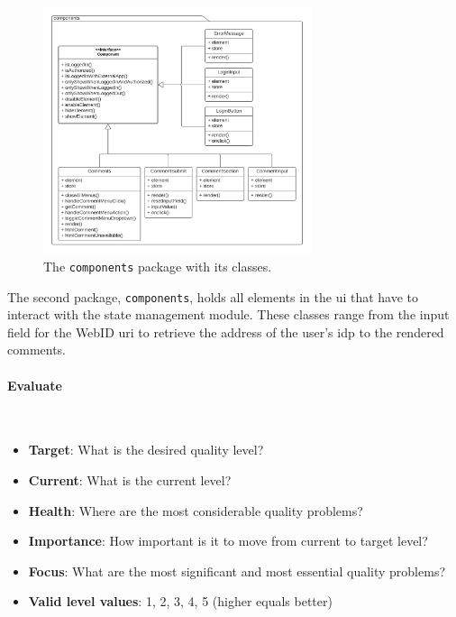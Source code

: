 \begin{figure}[H]
    \centering
    \includegraphics[width=0.7\textwidth]{prototype/graphs/poc-comment-package-components.png}
    \caption{The \texttt{components} package with its classes.}
    \label{fig:poc-comment-package-components}
\end{figure}

The second package, \texttt{components}, holds all elements in the \gls{ui} that have to interact with the state management module. These classes range from the input field for the WebID \gls{uri} to retrieve the address of the user's \gls{idp} to the rendered comments.
\vspace{0.5cm}
\paragraph{Evaluate}\mbox{}\\

\begin{itemize}
    \item \textbf{Target}: What is the desired quality level?
    \item \textbf{Current}: What is the current level?
    \item \textbf{Health}: Where are the most considerable quality problems?
    \item \textbf{Importance}: How important is it to move from current to target level?
    \item \textbf{Focus}: What are the most significant and most essential quality problems?
    \item \textbf{Valid level values}: 1, 2, 3, 4, 5 (higher equals better)
\end{itemize}

